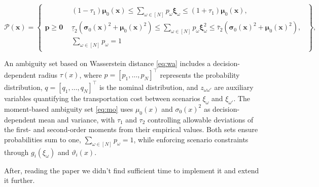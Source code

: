 \documentclass[12pt, letterpaper]{article}
\begin{document}
		\begin{equation}\label{eq:mo}
			\mathcal{P}(\boldsymbol{x})=\left\{\begin{array}{l|l}
			\boldsymbol{p} \geq \mathbf{0} & \begin{array}{l}
			\left(1-\tau_1\right) \boldsymbol{\mu}_0(\boldsymbol{x}) \leq \sum_{\omega \in[N]} p_\omega \boldsymbol{\xi}_\omega \leq\left(1+\tau_1\right) \boldsymbol{\mu}_0(\boldsymbol{x}), \\
			\underline{\tau}_2\left(\boldsymbol{\sigma}_0(\boldsymbol{x})^2+\boldsymbol{\mu}_0(\boldsymbol{x})^2\right) \leq \sum_{\omega \in[N]} p_\omega \boldsymbol{\xi}_\omega^2 \leq \bar{\tau}_2\left(\boldsymbol{\sigma}_0(\boldsymbol{x})^2+\boldsymbol{\mu}_0(\boldsymbol{x})^2\right), \\
			\sum_{\omega \in[N]} p_\omega=1
			\end{array}
			\end{array}\right\},
			\end{equation}

			An ambiguity set based on Wasserstein distance \ref{eq:wa} includes a decision-dependent radius $\tau(x)$, where $p = [p_1, \ldots, p_N]^\top$ represents the probability distribution, $q = [q_1, \ldots, q_N]^\top$ is the nominal distribution, and $z_{\omega\omega'}$ are auxiliary variables quantifying the transportation cost between scenarios $\xi_\omega$ and $\xi_{\omega'}$. The moment-based ambiguity set \ref{eq:mo} uses $\mu_0(x)$ and $\sigma_0(x)^2$ as decision-dependent mean and variance, with $\tau_1$ and $\tau_2$ controlling allowable deviations of the first- and second-order moments from their empirical values. Both sets ensure probabilities sum to one, $\sum_{\omega \in [N]} p_\omega = 1$, while enforcing scenario constraints through $g_i(\xi_\omega)$ and $\vartheta_i(x)$. 
			
			After, reading the paper we didn't find sufficient time to implement it and extend it further. 
		
	\newpage
	\printglossary[type=\acronymtype]
	
	\clearpage
	
	
\end{document}
